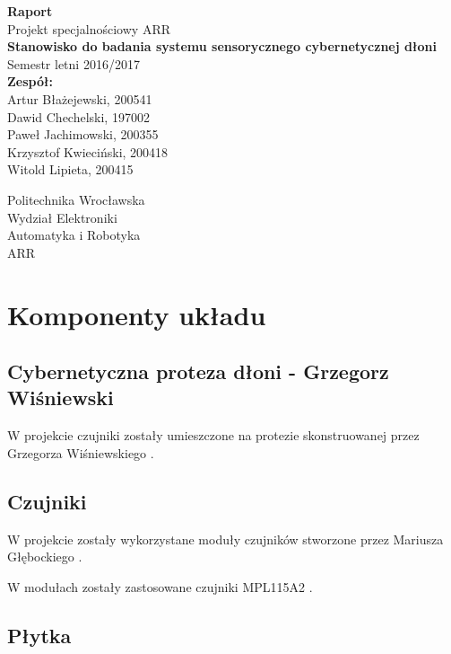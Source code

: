 \documentclass[a4paper,12pt]{article}
\begin{document}
\begin{titlepage}
\begin{center}
\vspace*{1cm}
{ \Large \textbf{ Raport }}\\[1cm]


{ \Large Projekt specjalnościowy ARR \\
\textbf{Stanowisko do badania systemu sensorycznego cybernetycznej dłoni}}\\
Semestr letni 2016/2017\\[2cm]

\Large{
\textbf{Zespół:}}\\
\large {Artur Błażejewski, 200541\\
Dawid Chechelski, 197002\\
Paweł Jachimowski, 200355\\
Krzysztof Kwieciński, 200418\\
Witold Lipieta, 200415}

\vfill
\Large
Politechnika Wrocławska\\
\large
Wydział Elektroniki\\
Automatyka i Robotyka\\
ARR
\end{center}
\end{titlepage}


	\section{Komponenty układu}
		\subsection{Cybernetyczna proteza dłoni - Grzegorz Wiśniewski}
			W projekcie czujniki zostały umieszczone na protezie skonstruowanej przez Grzegorza Wiśniewskiego \cite{Reka}.
		\subsection{Czujniki}
			W projekcie zostały wykorzystane moduły czujników stworzone przez Mariusza Głębockiego \cite{Moduly}.
			
			W modułach zostały zastosowane czujniki MPL115A2 \cite{MPL112A2}.
			
		\subsection{Płytka}
			
\end{document}
